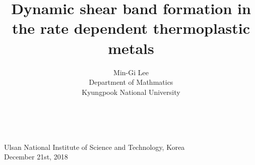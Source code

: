 \documentclass{beamer}
\begin{document}
\title[Localization ]{\LARGE Dynamic shear band formation in the rate dependent thermoplastic metals}
\author{\vskip 5pt \small {Min-Gi Lee}\\ \vskip 5pt \scriptsize Department of Mathmatics\\Kyungpook National University\\}
\date{~}
\begin{frame}
  \titlepage
  \vskip -60pt
  \center
  {\small
  {\scriptsize Ulsan National Institute of Science and Technology, Korea}\\
  {\scriptsize December 21st, 2018}\\}
\end{frame}
% 
% 
% 
% 
\end{document}
